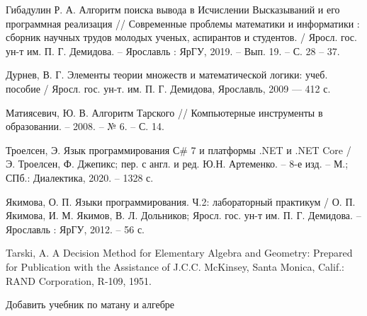\begin{thebibliography}{3}
    Гибадулин Р. А. Алгоритм поиска вывода в Исчислении Высказываний и его программная реализация // Современные проблемы математики и информатики : сборник научных трудов молодых ученых, аспирантов и студентов. / Яросл. гос. ун-т им. П. Г. Демидова. -- Ярославль : ЯрГУ, 2019. -- Вып. 19. -- С. 28 -- 37.

    Дурнев, В. Г. Элементы теории множеств и математической логики: учеб. пособие / Яросл. гос. ун-т. им. П. Г. Демидова, Ярославль, 2009 --- 412 с.

    Матиясевич, Ю. В. Алгоритм Тарского // Компьютерные инструменты в образовании. -- 2008. -- № 6. -- С. 14.

    Троелсен, Э. Язык программирования С\# 7 и платформы .NET и .NET Core / Э. Троелсен, Ф. Джепикс; пер. с англ. и ред. Ю.Н. Артеменко. -- 8-е изд. -- М.; СПб.: Диалектика, 2020. -- 1328 с.

    Якимова, О. П. Языки программирования. Ч.2: лабораторный практикум / О. П. Якимова, И. М. Якимов, В. Л. Дольников; Яросл. гос. ун-т им. П. Г. Демидова. -- Ярославль : ЯрГУ, 2012. -- 56 с.  

    Tarski, A. A Decision Method for Elementary Algebra and Geometry: Prepared for Publication with the Assistance of J.C.C. McKinsey, Santa Monica, Calif.: RAND Corporation, R-109, 1951. 

\end{thebibliography}

Добавить учебник по матану и алгебре

